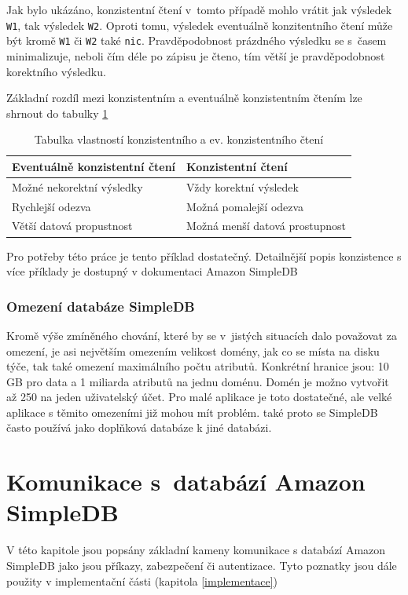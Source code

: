 \documentclass[oneside,12pt]{fithesis2}
\begin{document}
Jak bylo ukázáno, konzistentní čtení v~tomto případě mohlo vrátit jak výsledek \verb<W1<, tak výsledek \verb<W2<. Oproti tomu, výsledek eventuálně konzitentního čtení může být kromě \verb<W1< či \verb<W2< také \verb<nic<. Pravděpodobnost prázdného výsledku se s~časem minimalizuje, neboli čím déle po zápisu je čteno, tím větší je pravděpodobnost korektního výsledku.


Základní rozdíl mezi konzistentním a eventuálně konzistentním čtením lze shrnout do tabulky \ref{consistencyTable}
\begin{table}[h]
 \vspace{5mm}
 \begin{tabular}{l|l}
    Eventuálně konzistentní čtení & Konzistentní čtení\\ \hline
    Možné nekorektní výsledky & Vždy korektní výsledek\\ 
    Rychlejší odezva & Možná pomalejší odezva \\
    Větší datová propustnost & Možná menší datová prostupnost
 \end{tabular}
 \caption{Tabulka vlastností konzistentního a ev. konzistentního čtení}
 \label{consistencyTable}
\end{table}

Pro potřeby této práce je tento příklad dostatečný. Detailnější popis konzistence s více příklady je dostupný v dokumentaci Amazon SimpleDB \cite[strana 7, Consistency]{simpledbDeveloper}

\subsection{Omezení databáze SimpleDB}
Kromě výše zmíněného chování, které by se v~jistých situacích dalo považovat za omezení, je asi největším omezením velikost domény, jak co se místa na disku týče, tak také omezení maximálního počtu atributů. Konkrétní hranice jsou: 10 GB pro data a 1 miliarda atributů na jednu doménu. Domén je možno vytvořit až 250 na jeden uživatelský účet. Pro malé aplikace je toto dostatečné, ale velké aplikace s těmito omezeními již mohou mít problém. také proto se SimpleDB často používá jako doplňková databáze k jiné databázi\cite{nosqlNetflix}.


\chapter{Komunikace s~databází Amazon SimpleDB}
V této kapitole jsou popsány základní kameny komunikace s databází Amazon SimpleDB jako jsou příkazy, zabezpečení či autentizace. Tyto poznatky jsou dále použity v implementační části (kapitola \ref{implementace})
\end{document}
